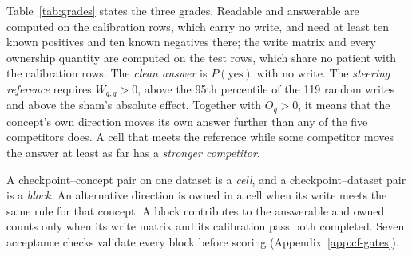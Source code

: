 \par\vspace{\intextsep}\noindent\begin{minipage}{\linewidth}
\makeatletter{}\makeatother
\centering
\small
\setlength{\tabcolsep}{3pt}
\caption{\textbf{The three RAW grades.} The data each grade is computed on and the condition under which a concept passes it.}
\label{tab:grades}
\end{minipage}\par\vspace{\intextsep}

Table~\ref{tab:grades} states the three grades. Readable and answerable are computed on the calibration rows, which carry no write, and need at least ten known positives and ten known negatives there; the write matrix and every ownership quantity are computed on the test rows, which share no patient with the calibration rows. The \emph{clean answer} is $P(\mathrm{yes})$ with no write. The \emph{steering reference} requires $W_{q,q}>0$, above the 95th percentile of the 119 random writes and above the sham's absolute effect. Together with $O_q>0$, it means that the concept's own direction moves its own answer further than any of the five competitors does. A cell that meets the reference while some competitor moves the answer at least as far has a \emph{stronger competitor}.

A checkpoint--concept pair on one dataset is a \emph{cell}, and a checkpoint--dataset pair is a \emph{block}. An alternative direction is owned in a cell when its write meets the same rule for that concept. A block contributes to the answerable and owned counts only when its write matrix and its calibration pass both completed. Seven acceptance checks validate every block before scoring (Appendix~\ref{app:cf-gates}).
\label{sec:gates}
